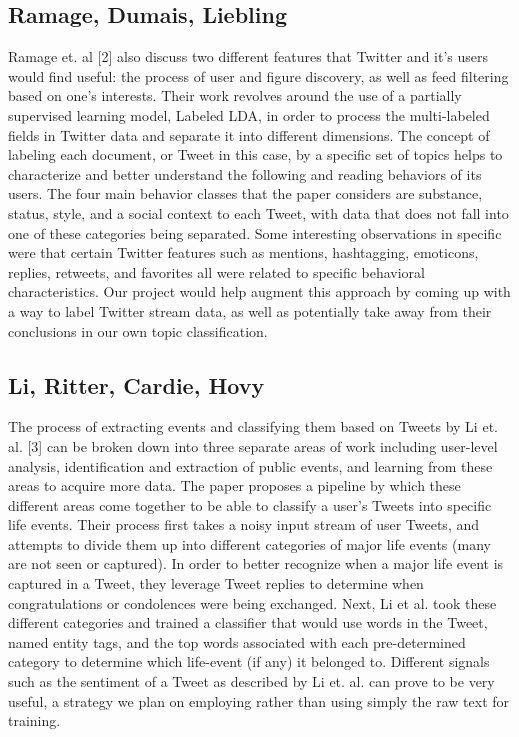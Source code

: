\documentclass[11pt]{article}
\begin{document}
\subsection{Ramage, Dumais, Liebling}

Ramage et. al [2] also discuss two different features that Twitter and it's users would find useful: the process of user and figure discovery, as well as feed filtering based on one’s interests. Their work revolves around the use of a partially supervised learning model, Labeled LDA, in order to process the multi-labeled fields in Twitter data and separate it into different dimensions. The concept of labeling each document, or Tweet in this case, by a specific set of topics helps to characterize and better understand the following and reading behaviors of its users. The four main behavior classes that the paper considers are substance, status, style, and a social context to each Tweet, with data that does not fall into one of these categories being separated. Some interesting observations in specific were that certain Twitter features such as mentions, hashtagging, emoticons, replies, retweets, and favorites all were related to specific behavioral characteristics. Our project would help augment this approach by coming up with a way to label Twitter stream data, as well as potentially take away from their conclusions in our own topic classification.

\subsection{Li, Ritter, Cardie, Hovy}

The process of extracting events and classifying them based on Tweets by Li et. al. [3] can be broken down into three separate areas of work including user-level analysis, identification and extraction of public events, and learning from these areas to acquire more data. The paper proposes a pipeline by which these different areas come together to be able to classify a user’s Tweets into specific life events. Their process first takes a noisy input stream of user Tweets, and attempts to divide them up into different categories of major life events (many are not seen or captured). In order to better recognize when a major life event is captured in a Tweet, they leverage Tweet replies to determine when congratulations or condolences were being exchanged. Next, Li et al. took these different categories and trained a classifier that would use words in the Tweet, named entity tags, and the top words associated with each pre-determined category to determine which life-event (if any) it belonged to. Different signals such as the sentiment of a Tweet as described by Li et. al. can prove to be very useful, a strategy we plan on employing rather than using simply the raw text for training.
\end{document}
